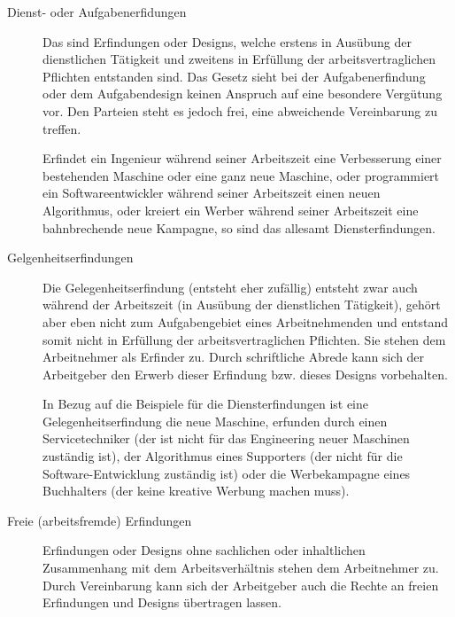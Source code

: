 \begin{description}
  \item[Dienst- oder Aufgabenerfidungen] Das sind Erfindungen oder Designs, welche erstens in Ausübung der dienstlichen Tätigkeit und zweitens in Erfüllung der arbeitsvertraglichen Pflichten entstanden sind. Das Gesetz sieht bei der Aufgabenerfindung oder dem Aufgabendesign keinen Anspruch auf eine besondere Vergütung vor. Den Parteien steht es jedoch frei, eine abweichende Vereinbarung zu treffen.
  
  Erfindet ein Ingenieur während seiner Arbeitszeit eine Verbesserung einer bestehenden Maschine oder eine ganz neue Maschine, oder programmiert ein Softwareentwickler während seiner Arbeitszeit einen neuen Algorithmus, oder kreiert ein Werber während seiner Arbeitszeit eine bahnbrechende neue Kampagne, so sind das allesamt Diensterfindungen.

  \item[Gelgenheitserfindungen] Die Gelegenheitserfindung (entsteht eher zufällig) entsteht zwar auch während der Arbeitszeit (in Ausübung der dienstlichen Tätigkeit), gehört aber eben nicht zum Aufgabengebiet eines Arbeitnehmenden und entstand somit nicht in Erfüllung der arbeitsvertraglichen Pflichten. Sie stehen dem Arbeitnehmer als Erfinder zu. 
  Durch schriftliche Abrede kann sich der Arbeitgeber den Erwerb dieser Erfindung bzw. dieses Designs vorbehalten.

  In Bezug auf die Beispiele für die Diensterfindungen ist eine Gelegenheitserfindung die neue Maschine, erfunden durch einen Servicetechniker (der ist nicht für das Engineering neuer Maschinen zuständig ist), der Algorithmus eines Supporters (der nicht für die Software-Entwicklung zuständig ist) oder die Werbekampagne eines Buchhalters (der keine kreative Werbung machen muss).
  
  \item[Freie (arbeitsfremde) Erfindungen] Erfindungen oder Designs ohne sachlichen oder inhaltlichen Zusammenhang mit dem Arbeitsverhältnis stehen dem Arbeitnehmer zu. Durch Vereinbarung kann sich der Arbeitgeber auch die Rechte an freien Erfindungen und Designs übertragen lassen.
\end{description}